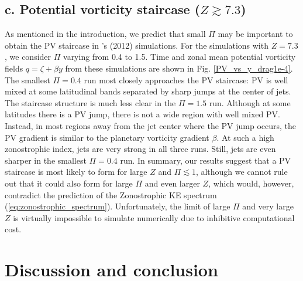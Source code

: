 \documentclass{jfm}
\begin{document}
\subsection*{c. Potential vorticity staircase ($Z\apprge7.3$)}

As mentioned in the introduction, we predict that small $\Pi$ may be
important to obtain the PV staircase in \citeauthor{Scott2012}'s (2012) simulations.
For the simulations with $Z=7.3$, we consider $\Pi$ varying from 0.4 to 1.5.
Time and zonal mean potential vorticity fields $q=\zeta+\beta y$
from these simulations are shown in Fig. \ref{PV_vs_y_drag1e-4}.
The smallest $\Pi=0.4$ run most closely approaches the PV staircase: 
PV is well mixed at some latitudinal bands 
separated by sharp jumps at the center of jets. 
The staircase structure is much less clear in the $\Pi=1.5$ run.
Although at some latitudes there is a PV jump, there is not a wide
region with well mixed PV. Instead, in most regions away from
the jet center where the PV jump occurs, the PV gradient is similar to the
planetary vorticity gradient $\beta$. At such a high zonostrophic index, 
jets are very strong in all three runs. Still, jets are even sharper 
in the smallest $\Pi=0.4$ run.  %
In summary, our results suggest that a PV staircase 
is most likely to form for large $Z$ and $\Pi\apprle1$,
although we cannot rule out that it could also form for large $\Pi$ and
even larger $Z$, which would, however, contradict the prediction of the 
Zonostrophic KE spectrum (\ref{eq:zonostrophic_spectrum}). Unfortunately,
the limit of large $\Pi$ and very large $Z$  is virtually impossible to simulate numerically due to inhibitive computational cost.


\section{Discussion and conclusion}
\end{document}
